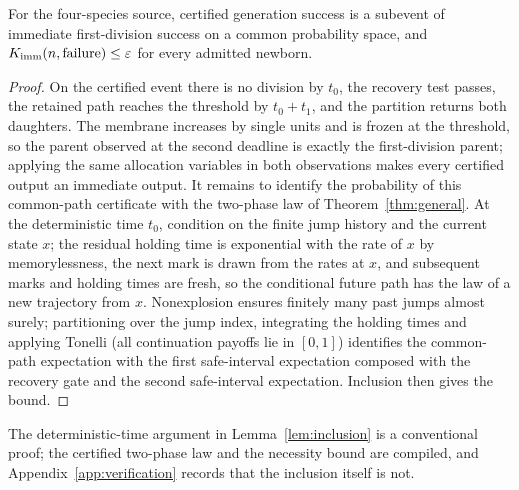 \begin{lemma}\label{lem:inclusion}
For the four-species source, certified generation success is a subevent of immediate first-division success on a common probability space, and $K_{\rm imm}(n,\mathrm{failure})\le\varepsilon$ for every admitted newborn.
\end{lemma}
\begin{proof}
On the certified event there is no division by $t_0$, the recovery test passes, the retained path reaches the threshold by $t_0+t_1$, and the partition returns both daughters. The membrane increases by single units and is frozen at the threshold, so the parent observed at the second deadline is exactly the first-division parent; applying the same allocation variables in both observations makes every certified output an immediate output. It remains to identify the probability of this common-path certificate with the two-phase law of Theorem~\ref{thm:general}. At the deterministic time $t_0$, condition on the finite jump history and the current state $x$; the residual holding time is exponential with the rate of $x$ by memorylessness, the next mark is drawn from the rates at $x$, and subsequent marks and holding times are fresh, so the conditional future path has the law of a new trajectory from $x$. Nonexplosion ensures finitely many past jumps almost surely; partitioning over the jump index, integrating the holding times and applying Tonelli (all continuation payoffs lie in $[0,1]$) identifies the common-path expectation with the first safe-interval expectation composed with the recovery gate and the second safe-interval expectation. Inclusion then gives the bound.
\end{proof}

The deterministic-time argument in Lemma~\ref{lem:inclusion} is a conventional proof; the certified two-phase law and the necessity bound are compiled, and Appendix~\ref{app:verification} records that the inclusion itself is not.

